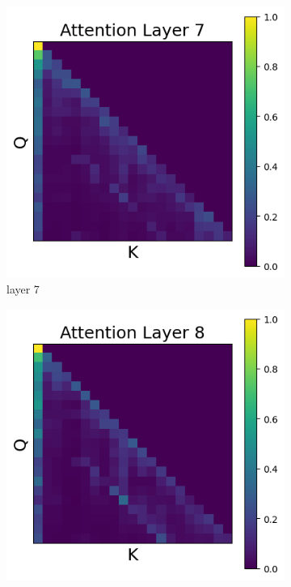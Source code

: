 \documentclass[11pt]{article}
\begin{document}
\begin{figure}[t]
    \begin{subfigure}[t]{0.24\textwidth}
    \centering
    \includegraphics[width=1.4\columnwidth]{figures/intervention1/layer_7.png}
    \caption{layer 7}
  \end{subfigure}\hfill
      \begin{subfigure}[t]{0.24\textwidth}
    \centering
    \includegraphics[width=1.4\columnwidth]{figures/intervention1/layer_8.png}

\end{subfigure}
\end{figure}
\end{document}
